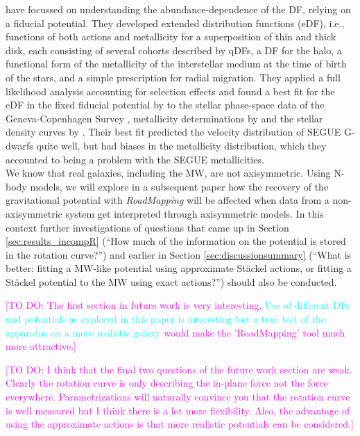 \documentclass[iop,revtex4]{emulateapj}
\newcommand{\RM}{{\sl RoadMapping}}
\newcommand{\HW}[1]{\textcolor{Cyan}{#1}}
\newcommand{\Wilma}[1]{\textcolor{Magenta}{#1}}
\begin{document}
\citet{2015MNRAS.449.3479S} have focussed on understanding the abundance-dependence of the DF, relying on a fiducial potential. They developed extended distribution functions (eDF), i.e., functions of both actions and metallicity for a superposition of thin and thick disk, each consisting of several cohorts described by qDFs, a DF for the halo, a functional form of the metallicity of the interstellar medium at the time of birth of the stars, and a simple prescription for radial migration. They applied a full likelihood analysis accounting for selection effects and found a best fit for the eDF in the fixed fiducial potential by \citet{1998MNRAS.294..429D} to the stellar phase-space data of the Geneva-Copenhagen Survey \citep{2004A&A...418..989N,2009A&A...501..941H}, metallicity determinations by \citet{2011A&A...530A.138C} and the stellar density curves by \citet{1983MNRAS.202.1025G}. Their best fit predicted the velocity distribution of SEGUE G-dwarfs \citep{2014ApJS..211...17A} quite well, but had biases in the metallicity distribution, which they accounted to being a problem with the SEGUE metallicities. \\

 We know that real galaxies, including the MW, are not axisymmetric. Using N-body models, we will explore in a subsequent paper how the recovery of the gravitational potential with \RM{} will be affected when data from a non-axisymmetric system get interpreted through axisymmetric models. In this context further investigations of questions that came up in Section \ref{sec:results_incompR} (``How much of the information on the potential is stored in the rotation curve?'') and earlier in Section \ref{sec:discussionsummary} (``What is better: fitting a MW-like potential using approximate St\"ackel actions, or fitting a St\"ackel potential to the MW using exact actions?'') should also be conducted.

\Wilma{[TO DO: The first section in future work is very interesting. \HW{Use of different DFs and potentials as explored in this paper is interesting but a true test of the apparatus on a more realistic galaxy} would make the 'RoadMapping' tool much more attractive.]}

\Wilma{[TO DO: I think that the final two questions of the future work section are weak. Clearly the rotation curve is only describing the in-plane force not the force everywhere. Parametrizations will naturally convince you that the rotation curve is well measured but I think there is a lot more flexibility. Also, the advantage of using the approximate actions is that more realistic potentials can be considered.]}
\end{document}

